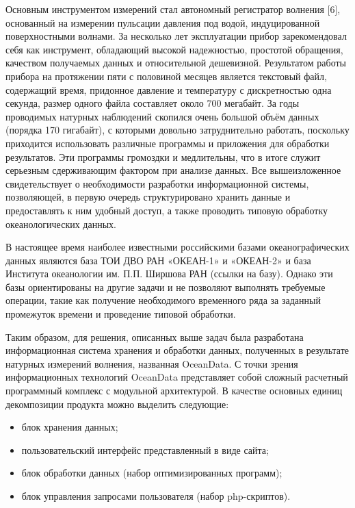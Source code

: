 Основным инструментом измерений стал автономный регистратор волнения \textcolor[rgb]{1.00,0.00,0.00}{[6]}, основанный на измерении пульсации давления под водой, индуцированной поверхностными волнами. За несколько лет эксплуатации прибор зарекомендовал себя как инструмент, обладающий высокой надежностью, простотой обращения, качеством получаемых данных и относительной дешевизной. Результатом работы прибора на протяжении пяти с половиной месяцев является текстовый файл, содержащий время, придонное давление и температуру с дискретностью одна секунда, размер одного файла составляет около 700 мегабайт. За годы проводимых натурных наблюдений скопился очень большой объём данных (порядка 170 гигабайт), с которыми довольно затруднительно работать, поскольку приходится использовать различные программы и приложения для обработки результатов. Эти программы громоздки и медлительны, что в итоге служит серьезным сдерживающим фактором при анализе данных. Все вышеизложенное свидетельствует о необходимости разработки информационной системы, позволяющей, в первую очередь структурировано хранить данные и предоставлять к ним удобный доступ, а также проводить типовую обработку океанологических данных.

В настоящее время наиболее известными российскими базами океанографических данных являются база ТОИ ДВО РАН «ОКЕАН-1» и «ОКЕАН-2»  и база Института океанологии им. П.П. Ширшова РАН \textcolor[rgb]{1.00,0.00,0.00}{(ссылки на базу)}. Однако эти базы ориентированы на другие задачи и не позволяют выполнять требуемые операции, такие как получение необходимого временного ряда за заданный промежуток времени и проведение типовой обработки.

Таким образом, для решения, описанных выше задач была разработана информационная система хранения и обработки данных, полученных в результате натурных измерений волнения, названная OceanData. С точки зрения информационных технологий OceanData представляет собой сложный расчетный программный комплекс с модульной архитектурой. В качестве основных единиц декомпозиции продукта можно выделить следующие:
\begin{itemize}
  \item блок хранения данных;
  \item пользовательский интерфейс представленный в виде сайта;
  \item блок обработки данных (набор оптимизированных программ);
  \item блок управления запросами пользователя (набор php-скриптов).
\end{itemize}

